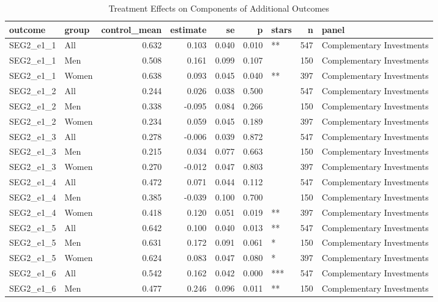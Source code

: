 \begin{table}

\caption{Treatment Effects on Components of Additional Outcomes}
\centering
\begin{tabular}[t]{llrrrrlrl}
\toprule
outcome & group & control\_mean & estimate & se & p & stars & n & panel\\
\midrule
SEG2\_e1\_1 & All & 0.632 & 0.103 & 0.040 & 0.010 & ** & 547 & Complementary Investments\\
SEG2\_e1\_1 & Men & 0.508 & 0.161 & 0.099 & 0.107 &  & 150 & Complementary Investments\\
SEG2\_e1\_1 & Women & 0.638 & 0.093 & 0.045 & 0.040 & ** & 397 & Complementary Investments\\
SEG2\_e1\_2 & All & 0.244 & 0.026 & 0.038 & 0.500 &  & 547 & Complementary Investments\\
SEG2\_e1\_2 & Men & 0.338 & -0.095 & 0.084 & 0.266 &  & 150 & Complementary Investments\\
\addlinespace
SEG2\_e1\_2 & Women & 0.234 & 0.059 & 0.045 & 0.189 &  & 397 & Complementary Investments\\
SEG2\_e1\_3 & All & 0.278 & -0.006 & 0.039 & 0.872 &  & 547 & Complementary Investments\\
SEG2\_e1\_3 & Men & 0.215 & 0.034 & 0.077 & 0.663 &  & 150 & Complementary Investments\\
SEG2\_e1\_3 & Women & 0.270 & -0.012 & 0.047 & 0.803 &  & 397 & Complementary Investments\\
SEG2\_e1\_4 & All & 0.472 & 0.071 & 0.044 & 0.112 &  & 547 & Complementary Investments\\
\addlinespace
SEG2\_e1\_4 & Men & 0.385 & -0.039 & 0.100 & 0.700 &  & 150 & Complementary Investments\\
SEG2\_e1\_4 & Women & 0.418 & 0.120 & 0.051 & 0.019 & ** & 397 & Complementary Investments\\
SEG2\_e1\_5 & All & 0.642 & 0.100 & 0.040 & 0.013 & ** & 547 & Complementary Investments\\
SEG2\_e1\_5 & Men & 0.631 & 0.172 & 0.091 & 0.061 & * & 150 & Complementary Investments\\
SEG2\_e1\_5 & Women & 0.624 & 0.083 & 0.047 & 0.080 & * & 397 & Complementary Investments\\
\addlinespace
SEG2\_e1\_6 & All & 0.542 & 0.162 & 0.042 & 0.000 & *** & 547 & Complementary Investments\\
SEG2\_e1\_6 & Men & 0.477 & 0.246 & 0.096 & 0.011 & ** & 150 & Complementary Investments\\

\end{tabular}
\end{table}
